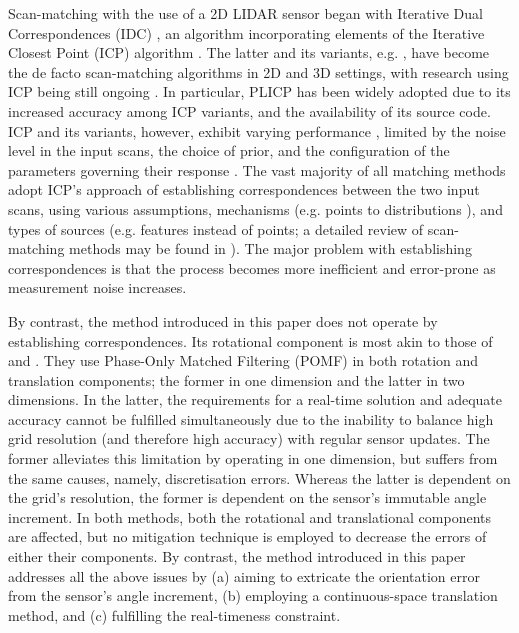 Scan-matching with the use of a 2D LIDAR sensor began with Iterative Dual
Correspondences (IDC) \cite{FengLu1994}, an algorithm incorporating elements of
the Iterative Closest Point (ICP) algorithm \cite{Besl1992b}. The latter and
its variants, e.g.  \cite{Pfister,Chetverikov,Censi2008b,Segal2009}, have
become the de facto scan-matching algorithms in 2D and 3D settings, with
research using ICP being still ongoing
\cite{Wang2018a,Tian2019a,Marchel2020,Koide2021}. In particular, PLICP
\cite{Censi2008b} has been widely adopted due to its increased accuracy among
ICP variants, and the availability of its source code. ICP and its variants,
however, exhibit varying performance \cite{Donoso2017a}, limited by the noise
level in the input scans, the choice of prior, and the configuration of the
parameters governing their response \cite{Filotheou2022a}. The vast majority of
all matching methods adopt ICP's approach of establishing correspondences
between the two input scans, using various assumptions, mechanisms (e.g. points
to distributions \cite{Biber,Bouraine2020}), and types of sources (e.g.
features instead of points; a detailed review of scan-matching methods may be
found in \cite{Filotheou2020a}). The major problem with establishing
correspondences is that the process becomes more inefficient and error-prone as
measurement noise increases.

By contrast, the method introduced in this paper does not operate by
establishing correspondences. Its rotational component is most akin to those of
\cite{Yu2018} and \cite{Jiang2018}. They use Phase-Only Matched Filtering
(POMF) \cite{Qin-ShengChen1994} in both rotation and translation components;
the former in one dimension and the latter in two dimensions. In the latter,
the requirements for a real-time solution and adequate accuracy cannot be
fulfilled simultaneously due to the inability to balance high grid resolution
(and therefore high accuracy) with regular sensor updates. The former
alleviates this limitation by operating in one dimension, but suffers from the
same causes, namely, discretisation errors. Whereas the latter is dependent on
the grid's resolution, the former is dependent on the sensor's immutable angle
increment.  In both methods, both the rotational and translational components
are affected, but no mitigation technique is employed to decrease the errors of
either their components. By contrast, the method introduced in this paper
addresses all the above issues by (a) aiming to extricate the orientation error
from the sensor's angle increment, (b) employing a continuous-space translation
method, and (c) fulfilling the real-timeness constraint.
